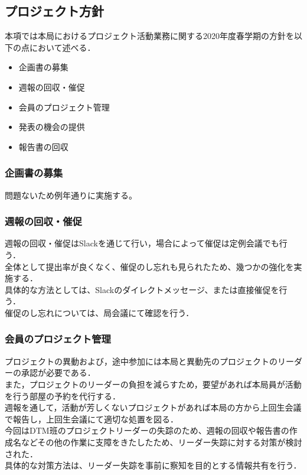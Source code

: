 ﻿\subsection*{プロジェクト方針}


本項では本局におけるプロジェクト活動業務に関する2020年度春学期の方針を以下の点において述べる．

\begin{itemize}
\item 企画書の募集
\item 週報の回収・催促
\item 会員のプロジェクト管理
\item 発表の機会の提供
\item 報告書の回収
\end{itemize}

\subsubsection*{企画書の募集}問題ないため例年通りに実施する。\\
\subsubsection*{週報の回収・催促}週報の回収・催促はSlackを通じて行い，場合によって催促は定例会議でも行う．\\全体として提出率が良くなく、催促のし忘れも見られたため、幾つかの強化を実施する．\\具体的な方法としては、Slackのダイレクトメッセージ、または直接催促を行う．\\催促のし忘れについては、局会議にて確認を行う．\\


\subsubsection*{会員のプロジェクト管理}プロジェクトの異動および，途中参加には本局と異動先のプロジェクトのリーダーの承認が必要である．\\また，プロジェクトのリーダーの負担を減らすため，要望があれば本局員が活動を行う部屋の予約を代行する．\\週報を通して，活動が芳しくないプロジェクトがあれば本局の方から上回生会議で報告し，上回生会議にて適切な処置を図る．\\今回はDTM班のプロジェクトリーダーの失踪のため、週報の回収や報告書の作成名などその他の作業に支障をきたしたため、リーダー失踪に対する対策が検討された．\\具体的な対策方法は、リーダー失踪を事前に察知を目的とする情報共有を行う．\\


